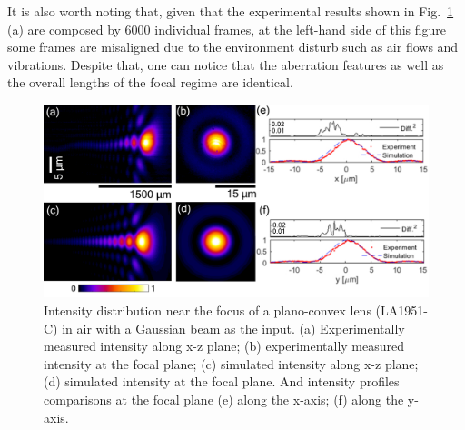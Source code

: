 \documentclass[9pt,twocolumn,twoside]{osajnl}
\begin{document}
It is also worth noting that, given that the experimental results shown in Fig.~\ref{fig:3} (a) are composed by 6000 individual frames, at the left-hand side of this figure some frames are misaligned due to the environment disturb such as air flows and vibrations.    
Despite that, one can notice that the aberration features as well as the overall lengths of the focal regime are identical.

\begin{figure}[t]
	\centering
	\includegraphics[width=\linewidth]{../AppOptics/figures/LA1951air.pdf}
	\caption{Intensity distribution near the focus of a plano-convex lens (LA1951-C) in air with a Gaussian beam as the input. (a) Experimentally measured intensity along x-z plane; (b) experimentally measured intensity at the focal plane; (c) simulated intensity along x-z plane; (d) simulated intensity at the focal plane. And intensity profiles comparisons at the focal plane (e) along the x-axis; (f) along the y-axis.}\label{fig:3}
\end{figure}
\end{document}
